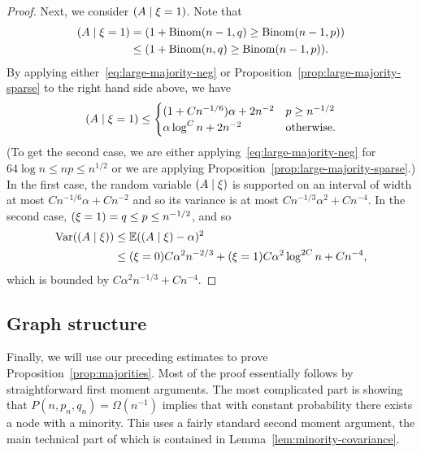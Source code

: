 \documentclass[EJP,final]{ejpecp}
\newcommand{\E}{\mathbb{E}}
\newcommand{\1}[1]{\mathbbm{1}_{\{#1\}}}
\let\Pr\relax
\DeclareMathOperator{\Pr}{Pr}
\DeclareMathOperator{\Var}{Var}
\DeclareMathOperator{\Binom}{Binom}
\begin{document}
\begin{proof}
 Next, we consider $\Pr(A \mid \xi = 1)$. Note that
 \begin{align*}
  \Pr(A \mid \xi = 1)
  &= \Pr(1 + \Binom(n-1, q) \ge \Binom(n-1, p)) \notag \\
  &\le \Pr(1 + \Binom(n, q) \ge \Binom(n-1, p)).
 \end{align*}
 By applying either~\eqref{eq:large-majority-neg}
 or Proposition~\ref{prop:large-majority-sparse}
 to the right hand side above, we have
 \[
   \Pr(A \mid \xi = 1) \le \begin{cases}
     (1 + C n^{-1/6}) \alpha + 2 n^{-2} & \text{$p \ge n^{-1/2}$} \\
     \alpha \log^C n + 2 n^{-2} & \text{otherwise}.
   \end{cases}
 \]
 (To get the second case, we are either applying~\eqref{eq:large-majority-neg}
 for $64 \log n \le np \le n^{1/2}$ or we are applying
 Proposition~\ref{prop:large-majority-sparse}.)
 In the first case, the random variable $\Pr(A \mid \xi)$
 is supported on an interval of width at most
 $C n^{-1/6} \alpha + C n^{-2}$ and so its variance is at most
 $C n^{-1/3} \alpha^2 + C n^{-4}$.
 In the second case, $\Pr(\xi = 1) = q \le p \le n^{-1/2}$,
 and so
 \begin{align*}
   \Var(\Pr(A \mid \xi))
   &\le \E (\Pr(A \mid \xi) - \alpha)^2 \\
   &\le \Pr(\xi = 0) C \alpha^ 2n^{-2/3} + \Pr(\xi = 1) C \alpha^2 \log^{2C} n + Cn^{-4},
 \end{align*}
 which is bounded by $C \alpha^2 n^{-1/3} + Cn^{-4}$.
\end{proof}

\subsection{Graph structure}
 Finally, we will use our preceding estimates to prove
 Proposition~\ref{prop:majorities}. Most of the proof essentially follows
 by straightforward first moment arguments. The most complicated part
 is showing that $P(n, p_n, q_n) = \Omega(n^{-1})$ implies that with constant probability there exists a
 node with a minority. This uses a fairly standard second
 moment argument,
 the main technical part of which is contained in
 Lemma~\ref{lem:minority-covariance}.
\end{document}
